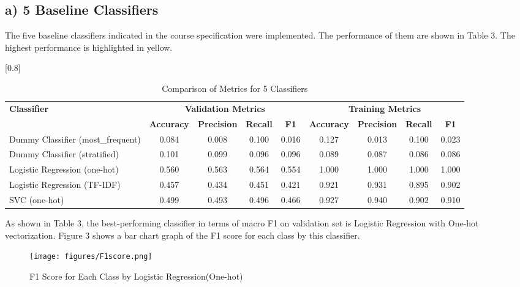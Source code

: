 \documentclass[a4paper,11pt]{article}
\begin{document}
\subsection{a) 5 Baseline Classifiers}
The five baseline classifiers indicated in the course specification were implemented.
The performance of them are shown in Table 3.
The highest performance is highlighted in yellow.

\begin{table}[htbp]
    \centering
    \caption{Comparison of Metrics for 5 Classifiers}
    \label{tab:classifier_metrics}
    \scalebox{0.8}[0.8]{
    \begin{tabular}{l|cccc|cccc}
        \hline
        \textbf{Classifier} & \multicolumn{4}{c|}{\textbf{Validation Metrics}} & \multicolumn{4}{c}{\textbf{Training Metrics}} \\
        & \textbf{Accuracy} & \textbf{Precision} & \textbf{Recall} & \textbf{F1} & \textbf{Accuracy} & \textbf{Precision} & \textbf{Recall} & \textbf{F1} \\
        \hline
        Dummy Classifier (most\_frequent) & {0.084} & 0.008 & 0.100 & 0.016 & 0.127 & 0.013 & 0.100 & 0.023 \\
        Dummy Classifier (stratified) & 0.101 & 0.099 & 0.096 & 0.096 & 0.089 & 0.087 & 0.086 & 0.086 \\
        \rowcolor[rgb]{0.9,0.9,0}Logistic Regression (one-hot) & \colorbox[rgb]{0.9, 0.9, 0}{0.560} & \colorbox[rgb]{0.9, 0.9, 0}{0.563} & \colorbox[rgb]{0.9, 0.9, 0}{0.564} & \colorbox[rgb]{0.9, 0.9, 0}{0.554} & 1.000 & 1.000 & 1.000 & 1.000 \\
        Logistic Regression (TF-IDF) & 0.457 & 0.434 & 0.451 & 0.421 & 0.921 & 0.931 & 0.895 & 0.902 \\
        SVC (one-hot) & 0.499 & 0.493 & 0.496 & 0.466 & 0.927 & 0.940 & 0.902 & 0.910 \\
        \hline
    \end{tabular}
    }
\end{table}

As shown in Table 3, the best-performing classifier in terms of macro F1 on validation set is Logistic Regression with One-hot vectorization.
Figure 3 shows a bar chart graph of the F1 score for each class by this classifier.

\begin{figure}[htbp]
  \begin{center}
  \texttt{[image: figures/F1score.png]}
  \caption{F1 Score for Each Class by Logistic Regression(One-hot)}
  \end{center}
\end{figure}
\end{document}
